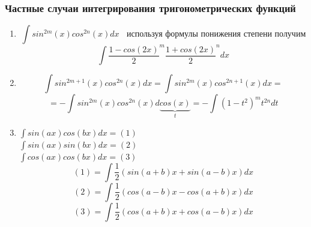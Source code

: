 \documentclass[a4paper]{article}
\theoremstyle{definition}
\numberwithin{theorem}{subsection}
\numberwithin{lemma}{subsection}
\numberwithin{definition}{subsection}
\numberwithin{comment*}{subsection}
\numberwithin{consequence}{subsection}
\numberwithin{property}{subsection}
\begin{document}
\subsubsection{Частные случаи интегрирования тригонометрических функций}
\begin{enumerate}
 \item $$\int sin^{2m}(x) cos^{2n}(x) dx \ \ \ \ \textit{используя формулы понижения степени получим} $$ $$  \int \frac{1-cos(2x)}{2}^m \frac{1+cos(2x)}{2}^n dx $$
 \item $$\int sin^{2m+1}(x) cos^{2n}(x) dx = \int sin^{2m}(x) cos^{2n+1}(x) dx = $$
       $$= - \int sin^{2m}(x) cos^{2n}(x) d \underbrace{cos(x)}_{t} = -\int (1-t^2)^m t^{2n} dt$$
 \item $\int sin(ax)cos(bx) dx = (1) $\\
       $\int sin(ax)sin(bx) dx = (2)$\\
       $\int cos(ax)cos(bx) dx = (3)$\\
       $$(1)=\int \frac{1}{2}(sin(a+b)x+sin(a-b)x) dx$$
       $$(2)=\int \frac{1}{2}(cos(a-b)x-cos(a+b)x) dx$$
       $$(3)=\int \frac{1}{2}(cos(a+b)x+cos(a-b)x) dx$$
\end{enumerate}
\end{document}
